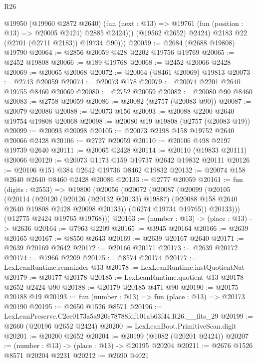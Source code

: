 \begin{lexlean}{R26}
\begin{coremodule}
                @19950
                (@19960 @2872 @2640)
                (fun (next : @13) => @19761 (fun (position : @13) => @20005 @2424) @2885 @2424)))
            (@19562 @2652)
            @2424)
          @2183
          @22
          (@2701 (@2711 @2183))
          @19734
          @90)))
@20059 := @2684 (@2688 @19808) @19790
@20064 := @2856 @20059 @428 @2202 @19756 @19769
@20065 := @2452 @19808
@20066 := @189 @19768
@20068 := @2452 @20066 @2428
@20069 := @20065 @20068
@20072 := @20064 (@8461 @20069) @19813
@20073 := @2743 @20059
@20074 := @20073 @178
@20079 := @20074 @2201 @2640 @19755 @8460 @20069
@20080 := @2752 @20059
@20082 := @20080 @90 @8460
@20083 := @2758 @20059
@20086 := @20082 (@2757 (@20083 @90))
@20087 := @20079 @20086
@20088 := @20073 @156
@20093 := @20088 @2200 @2640 @19754 @19808 @20068
@20098 := @20080 @19 @19808 (@2757 (@20083 @19))
@20099 := @20093 @20098
@20105 := @20073 @2198 @158 @19752 @2640 @20066 @2428
@20106 := @2727 @20059
@20110 := @20106 @498 @2197 @19739 @2640
@20111 := @20065 @2428
@20114 := @20110 (@19833 @20111) @20066
@20120 := @20073 @1173 @159 @19737 @2642 @19832 @20111
@20126 := @20106 @151 @384 @2642 @19736 @8462 @19832
@20132 := @20074 @158 @2640 @2640 @8460 @2428 @20086
@20133 := @2777 @20059
@20161 := fun (digits : @2553) =>
  @19800
    (@20056
      (@20072
        (@20087
          (@20099
            (@20105
              (@20114
                (@20120
                  (@20126 (@20132 @20133) @19887)
                  (@20088 @158 @2640 @2640 @19808 @2428 @20098 @20133))
                (@6274 @19734 @19765))
              @20133)))
        (@12775 @2424 @19765 @19768)))
@20163 := (number : @13) -> (place : @13) -> @2636
@20164 := @7963 @2209
@20165 := @3945 @20164
@20166 := @2639 @20165
@20167 := @8550 @2643
@20169 := @2639 @20167 @2640
@20171 := @2639 @20169 @2642
@20172 := @20166 @20171
@20173 := @2639 @20172
@20174 := @7966 @2209
@20175 := @8574 @20174
@20177 := LexLeanRuntime.remainder @13
@20178 := LexLeanRuntime.instQuotientNat
@20179 := @20177 @20178
@20185 := LexLeanRuntime.quotient @13 @20178 @2652 @2424 @90
@20188 := @20179 @20185 @471 @90
@20190 := @20175 @20188 @19
@20193 := fun (number : @13) => fun (place : @13) => @20173 @20190
@20195 := @2650 @1526 @8571
@20196 := LexLeanPreserve.C2ee0173a5a920c78788fdf101ab63f44.R26.__fits_29
@20199 := @2660 (@20196 @2652 @2424)
@20200 := LexLeanBoot.PrimitiveScan.digit
@20201 := @20200 @2652
@20204 := @20199 (@1082 (@20201 @2424))
@20207 := (number : @13) -> (place : @13) -> @20195 @20204
@20211 := @2676 @1526 @8571 @20204 @2231
@20212 := @2690 @4021

\end{coremodule}
\end{lexlean}
